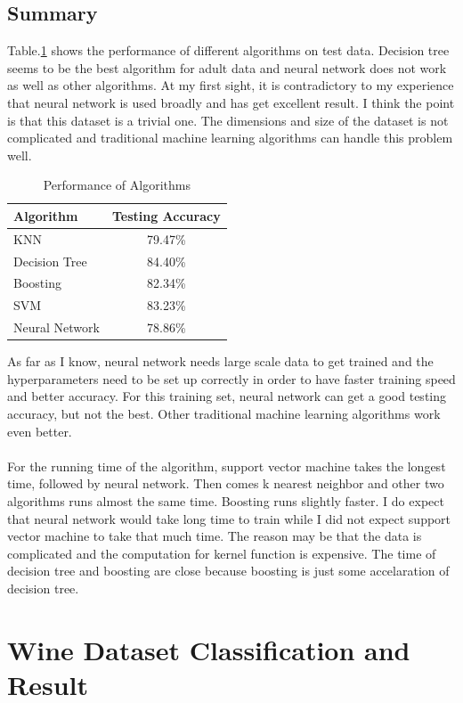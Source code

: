 \documentclass[11pt]{article}
\begin{document}
\subsection{Summary}
Table.\ref{tab:adult} shows the performance of different algorithms on test data. Decision tree seems to be the best algorithm for adult data and neural network does not work as well as other algorithms. At my first sight, it is contradictory to my experience that neural network is used broadly and has get excellent result. I think the point is that this dataset is a trivial one. The dimensions and size of the dataset is not complicated and traditional machine learning algorithms can handle this problem well.
\begin{table}[h!]
  \begin{center}
    \caption{Performance of Algorithms}
    \label{tab:adult}
    \begin{tabular}{l|c}
      \textbf{Algorithm} & \textbf{Testing Accuracy}\\
      \hline
      KNN & 79.47\%\\
      Decision Tree & 84.40\%\\
      Boosting & 82.34\%\\
      SVM & 83.23\% \\
      Neural Network & 78.86\%\\
    \end{tabular}
  \end{center}
\end{table}
As far as I know, neural network needs large scale data to get trained and the hyperparameters need to be set up correctly in order to have faster training speed and better accuracy. For this training set, neural network can get a good testing accuracy, but not the best. Other traditional machine learning algorithms work even better.\\
\\
For the running time of the algorithm, support vector machine takes the longest time, followed by neural network. Then comes k nearest neighbor and other two algorithms runs almost the same time. Boosting runs slightly faster. I do expect that neural network would take long time to train while I did not expect support vector machine to take that much time. The reason may be that the data is complicated and the computation for kernel function is expensive. The time of decision tree and boosting are close because boosting is just some accelaration of decision tree.
\section{Wine Dataset Classification and Result}
\end{document}
